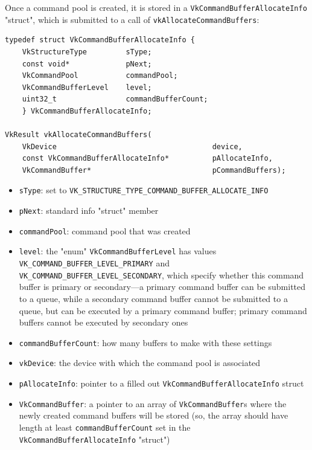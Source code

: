 \documentclass[12pt,letterpaper]{article}
\newcommand{\cil}[1]{\texttt{#1}}
\begin{document}
	Once a command pool is created, it is stored in a \cil{VkCommandBufferAllocateInfo} "struct", which is submitted to a call of \cil{vkAllocateCommandBuffers}:
		\begin{verbatim}
typedef struct VkCommandBufferAllocateInfo {
	VkStructureType         sType;
	const void*             pNext;
	VkCommandPool           commandPool;
	VkCommandBufferLevel    level;
	uint32_t                commandBufferCount;
	} VkCommandBufferAllocateInfo;
    
VkResult vkAllocateCommandBuffers(
    VkDevice                                    device,
    const VkCommandBufferAllocateInfo*          pAllocateInfo,
    VkCommandBuffer*                            pCommandBuffers);
		\end{verbatim}
        
		\begin{itemize}
			\item \cil{sType}: set to \cil{VK_STRUCTURE_TYPE_COMMAND_BUFFER_ALLOCATE_INFO}
			
			\item \cil{pNext}: standard info "struct" member
			
			\item \cil{commandPool}: command pool that was created
			
			\item \cil{level}: the "enum" \cil{VkCommandBufferLevel} has values \cil{VK_COMMAND_BUFFER_LEVEL_PRIMARY} and \cil{VK_COMMAND_BUFFER_LEVEL_SECONDARY}, which specify whether this command buffer is primary or secondary---a primary command buffer can be submitted to a queue, while a secondary command buffer cannot be submitted to a queue, but can be executed by a primary command buffer; primary command buffers cannot be executed by secondary ones
			
			\item \cil{commandBufferCount}: how many buffers to make with these settings

			\item \cil{vkDevice}: the device with which the command pool is associated
			
			\item \cil{pAllocateInfo}: pointer to a filled out \cil{VkCommandBufferAllocateInfo} struct
			
			\item \cil{VkCommandBuffer}: a pointer to an array of \cil{VkCommandBuffer}s where the newly created command buffers will be stored (so, the array should have length at least \cil{commandBufferCount} set in the \cil{VkCommandBufferAllocateInfo} "struct")
		\end{itemize}
	
\end{document}
